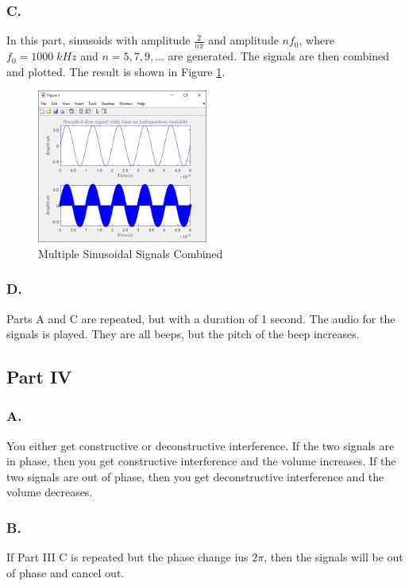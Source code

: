\documentclass[12pt]{article}
\begin{document}
\subsubsection*{C.}
In this part, sinusoids with amplitude $\frac{2}{n\pi}$ and amplitude $n f_0$,
where $f_0=1000 \; kHz$ and $n=5,7,9,...$ are generated. The signals are then combined
and plotted. The result is shown in Figure \ref{fig:fig9}.
\begin{figure}[H]
	\centering
	\includegraphics[width=0.5\textwidth]{fig 3c.png}
	\caption{Multiple Sinusoidal Signals Combined}
	\label{fig:fig9}
\end{figure}

\subsubsection*{D.}
Parts A and C are repeated, but with a duration of 1 second. The audio for the signals
is played. They are all beeps, but the pitch of the beep increases.

\subsection{Part IV}
\subsubsection*{A.}
You either get constructive or deconstructive interference. If the two signals are in 
phase, then you get constructive interference and the volume increases. If the two signals are out of phase, 
then you get deconstructive interference and the volume decreases.

\subsubsection*{B.}
If Part III C is repeated but the phase change ius $2\pi$, 
then the signals will be out of phase and cancel out.
\end{document}
